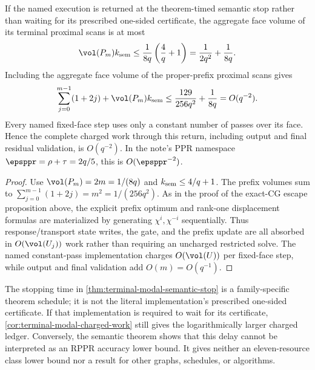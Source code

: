 \begin{corollary}
\label{cor:terminal-modal-semantic-work}
If the named execution is returned at the theorem-timed semantic stop rather
than waiting for its prescribed one-sided certificate, the aggregate face
volume of its terminal proximal scans is at most
\begin{equation}
 \vol(P_m)k_{\rm sem}
 \le\frac1{8q}\left(\frac4q+1\right)
 =\frac1{2q^2}+\frac1{8q}.
 \label{eq:terminal-modal-semantic-terminal-work}
\end{equation}
Including the aggregate face volume of the proper-prefix proximal scans gives
\begin{equation}
 \sum_{j=0}^{m-1}(1+2j)+\vol(P_m)k_{\rm sem}
 \le\frac{129}{256q^2}+\frac1{8q}=O(q^{-2}).
 \label{eq:terminal-modal-semantic-total-work}
\end{equation}
Every named fixed-face step uses only a constant number of passes over its
face.  Hence the complete charged work through this return, including output
and final residual validation, is $O(q^{-2})$.  In the note's PPR namespace
$\epsppr=\rho+\tau=2q/5$, this is $O(\epsppr^{-2})$.
\end{corollary}

\begin{proof}
Use $\vol(P_m)=2m=1/(8q)$ and
$k_{\rm sem}\le4/q+1$.  The prefix volumes sum to
$\sum_{j=0}^{m-1}(1+2j)=m^2=1/(256q^2)$.
As in the proof of the exact-CG escape proposition above, the explicit prefix
optimum and rank-one displacement formulas are materialized by generating
$\chi^i,\chi^{-i}$ sequentially.  Thus response/transport state writes, the
gate, and the prefix update are all absorbed in $O(\vol(U_j))$ work rather
than requiring an uncharged restricted solve.
The named constant-pass implementation charges $O(\vol(U))$ per fixed-face
step, while output and final validation add $O(m)=O(q^{-1})$.
\end{proof}

\begin{remark}
The stopping time in \cref{thm:terminal-modal-semantic-stop} is a
family-specific theorem schedule; it is not the literal implementation's
prescribed one-sided certificate.  If that implementation is required to
wait for its certificate, \cref{cor:terminal-modal-charged-work} still gives
the logarithmically larger charged ledger.  Conversely, the semantic theorem
shows that this delay cannot be interpreted as an RPPR accuracy lower bound.
It gives neither an eleven-resource class lower bound nor a result for other
graphs, schedules, or algorithms.
\end{remark}
